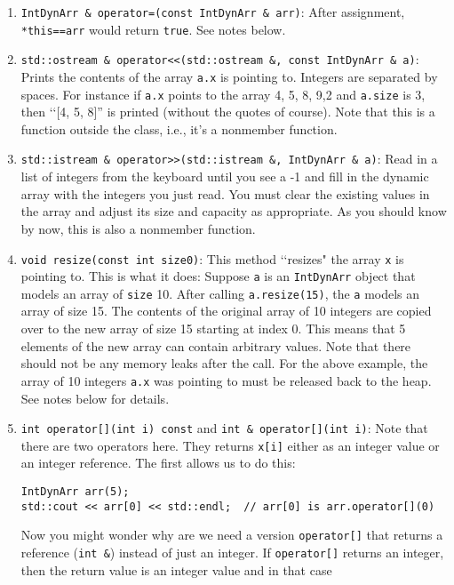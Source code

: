 \begin{enumerate}
\item \verb!IntDynArr & operator=(const IntDynArr & arr)!: After assignment, 
\verb!*this==arr! would return \verb!true!. See notes below.

\item \verb!std::ostream & operator<<(std::ostream &, const IntDynArr & a)!: 
Prints the contents of the array \verb!a.x! is pointing to. Integers are 
separated by spaces. For instance if \verb!a.x! points to the array 
4, 5, 8, 9,2 and \verb!a.size! is 3, then \lq\lq [4, 5, 8]” is printed 
(without the quotes of course). Note that this is a function outside the 
class, i.e., it's a nonmember function.

\item \verb!std::istream & operator>>(std::istream &, IntDynArr & a)!: 
Read in a list of integers from the keyboard until you see a -1 and 
fill in the dynamic array with the integers you just read. You must clear 
the existing values in the array and adjust its size and capacity as 
appropriate. As you should know by now, this is also a nonmember function. 

\item \verb!void resize(const int size0)!: This method \lq\lq resizes" the 
array \verb!x! is pointing to. This is what it does: Suppose \verb!a! is an 
\verb!IntDynArr! object that models an array of \verb!size! 10. After 
calling \verb!a.resize(15)!, the \verb!a! models an array of size 15. The 
contents of the original array of 10 integers are copied over to the 
new array of size 15 starting at index 0. This means that 5 elements of 
the new array can contain arbitrary values. Note that there should not be 
any memory leaks after the call. For the above example, the array of 10 
integers \verb!a.x! was pointing to must be released back to the heap. See notes 
below for details.

\item \verb!int operator[](int i) const! and \verb!int & operator[](int i)!:
Note that there are two operators here. They returns \verb!x[i]! either as an 
integer value or an integer reference. The first allows us to do this:

\begin{Verbatim}[frame=single]
IntDynArr arr(5);
std::cout << arr[0] << std::endl;  // arr[0] is arr.operator[](0)
\end{Verbatim}

Now you might wonder why are we need a version \verb!operator[]! that 
returns a reference (\verb!int &!) instead of just an integer. If 
\verb!operator[]! returns an integer, then the return value is an 
integer value and in that case


\end{enumerate}
